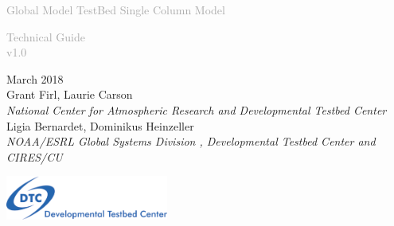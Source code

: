 \begin{titlepage}
\renewcommand{\thefootnote}{\fnsymbol{footnote}}

\vspace*{1em}
\noindent

\begin{center}
\textcolor{darkgray}{\bigsf Global Model TestBed Single Column Model\\}
\vspace*{1em}\par

\textcolor{darkgray}{\bigst Technical Guide \\v1.0}
\vspace*{1em}\par

\large{March 2018}\\[4em]

Grant Firl, Laurie Carson\\
\textit{\small{National Center for Atmospheric Research and Developmental Testbed Center}}\\[4em]

Ligia Bernardet, Dominikus Heinzeller\\
\textit{\small{NOAA/ESRL Global Systems Division , Developmental Testbed Center and CIRES/CU}}\\[4em]

\vspace{4em}

\includegraphics[width=0.4\textwidth]{images/dtc_logo.png}\\[2em]

\end{center}
\end{titlepage}
\pagebreak{}




